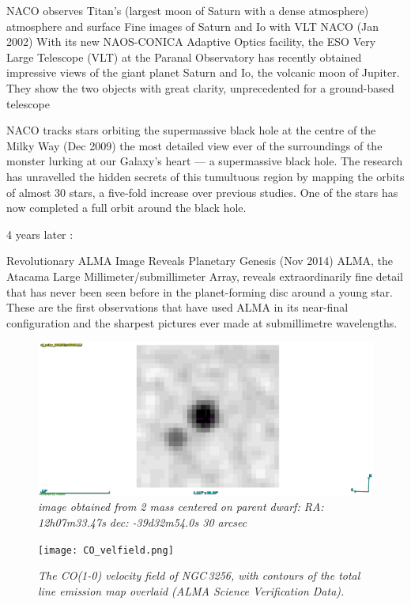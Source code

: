 \documentclass[12pt,a4paper]{article}  %
\begin{document}
NACO observes Titan's (largest moon of Saturn with a dense atmosphere) atmosphere and surface
Fine images of Saturn and Io with VLT NACO  (Jan 2002)
With its new NAOS-CONICA Adaptive Optics facility, the ESO Very Large Telescope (VLT) at the Paranal Observatory has recently obtained impressive views of the giant planet Saturn and Io, the volcanic moon of Jupiter. They show the two objects with great clarity, unprecedented for a ground-based telescope



NACO tracks stars orbiting the supermassive black hole at the centre of the Milky Way  (Dec 2009)
the most detailed view ever of the surroundings of the monster lurking at our Galaxy's heart — a supermassive black hole. The research has unravelled the hidden secrets of this tumultuous region by mapping the orbits of almost 30 stars, a five-fold increase over previous studies. One of the stars has now completed a full orbit around the black hole.



4 years later :

Revolutionary ALMA Image Reveals Planetary Genesis (Nov 2014)
ALMA, the Atacama Large Millimeter/submillimeter Array, reveals extraordinarily fine detail that has never been seen before in the planet-forming disc around a young star. These are the first observations that have used ALMA in its near-final configuration and the sharpest pictures ever made at submillimetre wavelengths. 


\begin{figure}[tbh]
\includegraphics[scale=0.4]{2mass.png}
\caption{\em{image obtained from 2 mass centered on parent dwarf:  RA: 12h07m33.47s dec: -39d32m54.0s  30 arcsec}}
\end{figure}




\begin{figure}[tbh]
\texttt{[image: CO\_velfield.png]}
\caption{\em{The CO(1-0) velocity field of NGC\,3256, with contours 
of the total line emission map overlaid (ALMA Science Verification Data).
}}
\end{figure}
\end{document}
